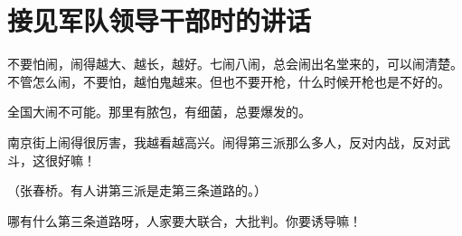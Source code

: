 \section[接见军队领导干部时的讲话（一九六七年七月十三日）]{接见军队领导干部时的讲话}


不要怕闹，闹得越大、越长，越好。七闹八闹，总会闹出名堂来的，可以闹清楚。不管怎么闹，不要怕，越怕鬼越来。但也不要开枪，什么时候开枪也是不好的。

全国大闹不可能。那里有脓包，有细菌，总要爆发的。

南京街上闹得很厉害，我越看越高兴。闹得第三派那么多人，反对内战，反对武斗，这很好嘛！

（张春桥。有人讲第三派是走第三条道路的。）

哪有什么第三条道路呀，人家要大联合，大批判。你要诱导嘛！


